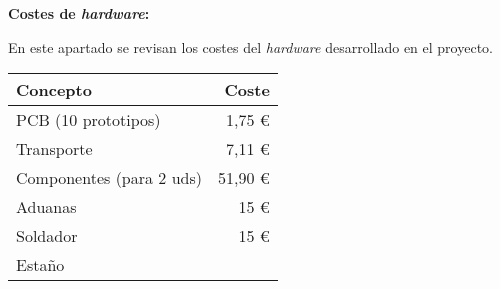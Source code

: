 \textbf{Costes de \emph{hardware}:}

En este apartado se revisan los costes del \emph{hardware} desarrollado en el proyecto.

\begin{longtable}[]{@{}lr@{}}
\toprule
\begin{minipage}[b]{0.38\columnwidth}\raggedright\strut
\textbf{Concepto}\strut
\end{minipage} & \begin{minipage}[b]{0.20\columnwidth}\raggedright\strut
\textbf{Coste}\strut
\end{minipage}\tabularnewline
\midrule
\endhead
\begin{minipage}[t]{0.38\columnwidth}\raggedright\strut
PCB (10 prototipos)\strut
\end{minipage} & \begin{minipage}[t]{0.20\columnwidth}\raggedright\strut
1,75 \euro{}\strut
\end{minipage}\tabularnewline
\begin{minipage}[t]{0.38\columnwidth}\raggedright\strut
Transporte\strut
\end{minipage} & \begin{minipage}[t]{0.20\columnwidth}\raggedright\strut
7,11 \euro{}\strut
\end{minipage}\tabularnewline
\begin{minipage}[t]{0.38\columnwidth}\raggedright\strut
Componentes (para 2 uds)\strut
\end{minipage} & \begin{minipage}[t]{0.20\columnwidth}\raggedright\strut
51,90 \euro{}\strut
\end{minipage}\tabularnewline
\begin{minipage}[t]{0.38\columnwidth}\raggedright\strut
Aduanas\strut
\end{minipage} & \begin{minipage}[t]{0.20\columnwidth}\raggedright\strut
15 \euro{}\strut
\end{minipage}\tabularnewline
\begin{minipage}[t]{0.38\columnwidth}\raggedright\strut
Soldador\strut
\end{minipage} & \begin{minipage}[t]{0.20\columnwidth}\raggedright\strut
15 \euro{}\strut
\end{minipage}\tabularnewline
\begin{minipage}[t]{0.38\columnwidth}\raggedright\strut
Estaño\strut
\end{minipage} & \begin{minipage}[t]{0.20\columnwidth}\raggedright\strut

\end{minipage}
\end{longtable}
